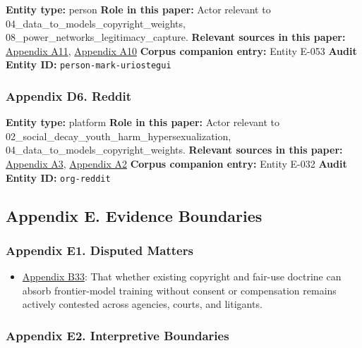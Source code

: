 \documentclass[
  american,
  11pt,
  letterpaper,
]{article}
\providecommand{\tightlist}{%
  \setlength{\itemsep}{0pt}\setlength{\parskip}{0pt}}
\begin{document}
\textbf{Entity type:} person \textbf{Role in this paper:} Actor relevant
to 04\_data\_to\_models\_copyright\_weights,
08\_power\_networks\_legitimacy\_capture. \textbf{Relevant sources in
this paper:}
\hyperref[appendix-a11-ai-copyright-weights-a-new-frontier-in-intellectual-property-law]{Appendix
A11},
\hyperref[appendix-a10-bipartisan-house-task-force-report-on-artificial-intelligence]{Appendix
A10} \textbf{Corpus companion entry:} Entity E-053 \textbf{Audit Entity
ID:} \texttt{person-mark-uriostegui}

\subsubsection{Appendix D6. Reddit}\label{appendix-d6-reddit}

\textbf{Entity type:} platform \textbf{Role in this paper:} Actor
relevant to 02\_social\_decay\_youth\_harm\_hypersexualization,
04\_data\_to\_models\_copyright\_weights. \textbf{Relevant sources in
this paper:}
\hyperref[appendix-a3-reddit-strikes-60m-deal-allowing-google-to-train-ai-models-on-its-posts-unveils-ipo-plans]{Appendix
A3},
\hyperref[appendix-a2-language-models-are-unsupervised-multitask-learners]{Appendix
A2} \textbf{Corpus companion entry:} Entity E-032 \textbf{Audit Entity
ID:} \texttt{org-reddit}

\subsection{Appendix E. Evidence
Boundaries}\label{appendix-e.-evidence-boundaries}

\subsubsection{Appendix E1. Disputed
Matters}\label{appendix-e1-disputed-matters}

\begin{itemize}
\tightlist
\item
  \hyperref[appendix-b33-whether-existing-copyright-and-fair-use-doctrine-can-absorb-frontier-model-traini]{Appendix
  B33}: That whether existing copyright and fair-use doctrine can absorb
  frontier-model training without consent or compensation remains
  actively contested across agencies, courts, and litigants.
\end{itemize}

\subsubsection{Appendix E2. Interpretive
Boundaries}\label{appendix-e2-interpretive-boundaries}
\end{document}
